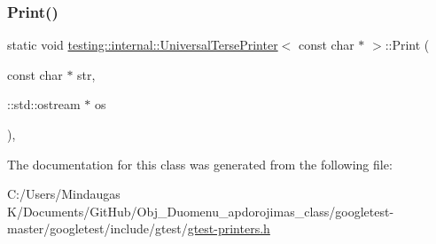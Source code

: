 \subsubsection{\texorpdfstring{Print()}{Print()}\hspace{0.1cm}{\footnotesize\ttfamily [3/3]}}
{\footnotesize\ttfamily static void \mbox{\hyperlink{classtesting_1_1internal_1_1_universal_terse_printer}{testing\+::internal\+::\+Universal\+Terse\+Printer}}$<$ const char $\ast$ $>$\+::Print (\begin{DoxyParamCaption}\item[{const char $\ast$}]{str,  }\item[{\+::std\+::ostream $\ast$}]{os }\end{DoxyParamCaption})\hspace{0.3cm}{\ttfamily [inline]}, {\ttfamily [static]}}



The documentation for this class was generated from the following file\+:\begin{DoxyCompactItemize}
\item 
C\+:/\+Users/\+Mindaugas K/\+Documents/\+Git\+Hub/\+Obj\+\_\+\+Duomenu\+\_\+apdorojimas\+\_\+class/googletest-\/master/googletest/include/gtest/\mbox{\hyperlink{googletest-master_2googletest_2include_2gtest_2gtest-printers_8h}{gtest-\/printers.\+h}}\end{DoxyCompactItemize}
